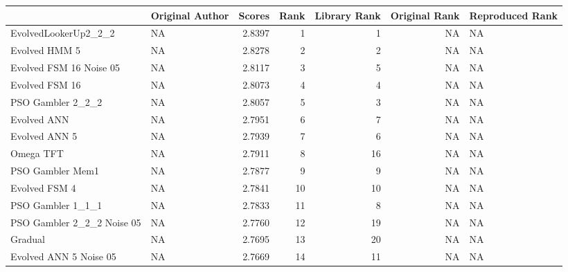 \begin{tabular}{llrrrrl}
\toprule
{} &                     Original Author &  Scores &  Rank &  Library Rank &  Original Rank & Reproduced Rank \\
\midrule
EvolvedLookerUp2\_2\_2       &                                  NA &  2.8397 &     1 &             1 &             NA &              NA \\
Evolved HMM 5              &                                  NA &  2.8278 &     2 &             2 &             NA &              NA \\
Evolved FSM 16 Noise 05    &                                  NA &  2.8117 &     3 &             5 &             NA &              NA \\
Evolved FSM 16             &                                  NA &  2.8073 &     4 &             4 &             NA &              NA \\
PSO Gambler 2\_2\_2          &                                  NA &  2.8057 &     5 &             3 &             NA &              NA \\
Evolved ANN                &                                  NA &  2.7951 &     6 &             7 &             NA &              NA \\
Evolved ANN 5              &                                  NA &  2.7939 &     7 &             6 &             NA &              NA \\
Omega TFT                  &                                  NA &  2.7911 &     8 &            16 &             NA &              NA \\
PSO Gambler Mem1           &                                  NA &  2.7877 &     9 &             9 &             NA &              NA \\
Evolved FSM 4              &                                  NA &  2.7841 &    10 &            10 &             NA &              NA \\
PSO Gambler 1\_1\_1          &                                  NA &  2.7833 &    11 &             8 &             NA &              NA \\
PSO Gambler 2\_2\_2 Noise 05 &                                  NA &  2.7760 &    12 &            19 &             NA &              NA \\
Gradual                    &                                  NA &  2.7695 &    13 &            20 &             NA &              NA \\
Evolved ANN 5 Noise 05     &                                  NA &  2.7669 &    14 &            11 &             NA &              NA \\

\end{tabular}
